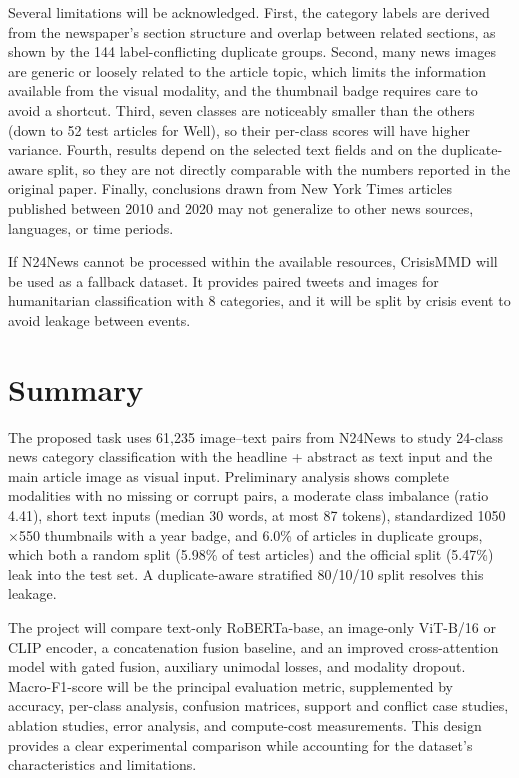 \documentclass[11pt,a4paper]{article}
\begin{document}
Several limitations will be acknowledged. First, the category labels are derived from the newspaper's section structure and overlap between related sections, as shown by the 144 label-conflicting duplicate groups. Second, many news images are generic or loosely related to the article topic, which limits the information available from the visual modality, and the thumbnail badge requires care to avoid a shortcut. Third, seven classes are noticeably smaller than the others (down to 52 test articles for Well), so their per-class scores will have higher variance. Fourth, results depend on the selected text fields and on the duplicate-aware split, so they are not directly comparable with the numbers reported in the original paper. Finally, conclusions drawn from New York Times articles published between 2010 and 2020 may not generalize to other news sources, languages, or time periods.

If N24News cannot be processed within the available resources, CrisisMMD will be used as a fallback dataset. It provides paired tweets and images for humanitarian classification with 8 categories, and it will be split by crisis event to avoid leakage between events.

\section{Summary}

The proposed task uses 61,235 image--text pairs from N24News to study 24-class news category classification with the headline + abstract as text input and the main article image as visual input. Preliminary analysis shows complete modalities with no missing or corrupt pairs, a moderate class imbalance (ratio 4.41), short text inputs (median 30 words, at most 87 tokens), standardized 1050$\times$550 thumbnails with a year badge, and 6.0\% of articles in duplicate groups, which both a random split (5.98\% of test articles) and the official split (5.47\%) leak into the test set. A duplicate-aware stratified 80/10/10 split resolves this leakage.

The project will compare text-only RoBERTa-base, an image-only ViT-B/16 or CLIP encoder, a concatenation fusion baseline, and an improved cross-attention model with gated fusion, auxiliary unimodal losses, and modality dropout. Macro-F1-score will be the principal evaluation metric, supplemented by accuracy, per-class analysis, confusion matrices, support and conflict case studies, ablation studies, error analysis, and compute-cost measurements. This design provides a clear experimental comparison while accounting for the dataset's characteristics and limitations.
\end{document}
